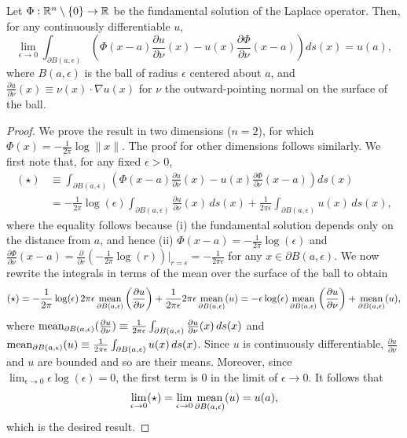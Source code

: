 \begin{proposition}[][11.13]
    Let $\Phi : \mathbb{R}^n \setminus \{0\} \to \mathbb{R}$ be the fundamental solution of the Laplace operator. Then, for any continuously differentiable $u$,
    \[\lim_{\epsilon \to 0} \int_{\partial B(a, \epsilon)} \left(\Phi(x - a)\frac{\partial u}{\partial\nu}(x) - u(x)\frac{\partial\Phi}{\partial\nu}(x - a)\right) ds(x) = u(a),\]
    where $B(a, \epsilon)$ is the ball of radius $\epsilon$ centered about $a$, and $\frac{\partial u}{\partial\nu}(x) \equiv \nu(x) \cdot \nabla u(x)$ for $\nu$ the outward-pointing normal on the surface of the ball.
\end{proposition}
\begin{proof}
    We prove the result in two dimensions ($n = 2$), for which $\Phi(x) = -\frac{1}{2\pi}\log\|x\|$. The proof for other dimensions follows similarly. We first note that, for any fixed $\epsilon > 0$,
    \begin{align*}
        (\star) &\equiv \int_{\partial B(a, \epsilon)} \left(\Phi(x - a)\frac{\partial u}{\partial\nu}(x) - u(x)\frac{\partial\Phi}{\partial\nu}(x - a)\right) ds(x) \\
        &= -\frac{1}{2\pi}\log(\epsilon)\int_{\partial B(a, \epsilon)} \frac{\partial u}{\partial\nu}(x)\,ds(x) + \frac{1}{2\pi\epsilon}\int_{\partial B(a, \epsilon)} u(x)\,ds(x),
    \end{align*}
    where the equality follows because (i) the fundamental solution depends only on the distance from $a$, and hence (ii) $\Phi(x - a) = -\frac{1}{2\pi}\log(\epsilon)$ and $\frac{\partial\Phi}{\partial\nu}(x - a) = \frac{\partial}{\partial r}(-\frac{1}{2\pi}\log(r))|_{r=\epsilon} = -\frac{1}{2\pi\epsilon}$ for any $x \in \partial B(a, \epsilon)$. We now rewrite the integrals in terms of the mean over the surface of the ball to obtain
    \[(\star) = -\frac{1}{2\pi}\log(\epsilon)\,2\pi\epsilon\operatorname*{mean}_{\partial B(a, \epsilon)}\left(\frac{\partial u}{\partial\nu}\right) + \frac{1}{2\pi\epsilon}2\pi\epsilon\operatorname*{mean}_{\partial B(a, \epsilon)}(u) = -\epsilon\log(\epsilon)\operatorname*{mean}_{\partial B(a, \epsilon)}\left(\frac{\partial u}{\partial\nu}\right) + \operatorname*{mean}_{\partial B(a, \epsilon)}(u),\]
    where $\operatorname*{mean}_{\partial B(a, \epsilon)}(\frac{\partial u}{\partial\nu}) \equiv \frac{1}{2\pi\epsilon}\int_{\partial B(a, \epsilon)} \frac{\partial u}{\partial\nu}(x)\,ds(x)$ and $\operatorname*{mean}_{\partial B(a, \epsilon)}(u) \equiv \frac{1}{2\pi\epsilon}\int_{\partial B(a, \epsilon)} u(x)\,ds(x)$. Since $u$ is continuously differentiable, $\frac{\partial u}{\partial\nu}$ and $u$ are bounded and so are their means. Moreover, since $\lim_{\epsilon \to 0} \epsilon\log(\epsilon) = 0$, the first term is 0 in the limit of $\epsilon \to 0$. It follows that
    \[\lim_{\epsilon \to 0} (\star) = \lim_{\epsilon \to 0} \operatorname*{mean}_{\partial B(a, \epsilon)}(u) = u(a),\]
    which is the desired result.
\end{proof}

